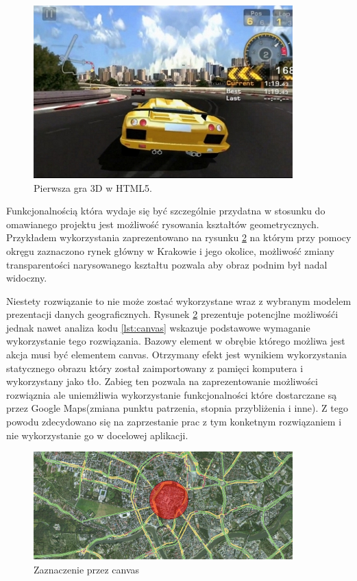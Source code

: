 \begin{figure}[H]
  \centering
    \includegraphics[width=100mm]{ge/html5_3d.jpg}
  \caption{Pierwsza gra 3D w HTML5.}
  \label{fig:html3d}
\end{figure}

Funkcjonalnością która wydaje się być szczególnie przydatna w stosunku do omawianego projektu jest możliwość rysowania kształtów geometrycznych. Przykładem wykorzystania zaprezentowano na rysunku \ref{fig:canvas1} na którym przy pomocy okręgu zaznaczono rynek główny w Krakowie i jego okolice, możliwość zmiany transparentości narysowanego kształtu pozwala aby obraz podnim był nadal widoczny.

Niestety rozwiązanie to nie może zostać wykorzystane wraz z wybranym modelem prezentacji danych geograficznych. Rysunek \ref{fig:canvas1} prezentuje potencjlne możliwośći jednak nawet analiza kodu \ref{lst:canvas} wskazuje podstawowe wymaganie wykorzystanie tego rozwiązania. Bazowy element w obrębie którego możliwa jest akcja musi być elementem canvas.
Otrzymany efekt jest wynikiem wykorzystania statycznego obrazu który został zaimportowany z pamięci komputera i wykorzystany jako tło. Zabieg ten pozwala na zaprezentowanie możliwości rozwiąznia ale uniemżliwia wykorzystanie funkcjonalności które dostarczane są przez Google Maps(zmiana punktu patrzenia, stopnia przybliżenia i inne). Z tego powodu zdecydowano się na zaprzestanie prac z tym konketnym rozwiązaniem i nie wykorzystanie go w docelowej aplikacji.

  \begin{figure}[H]
  \centering
    \includegraphics[width=100mm]{ge/canvas1.jpg}
  \caption{Zaznaczenie przez canvas}
  \label{fig:canvas1}
\end{figure}

